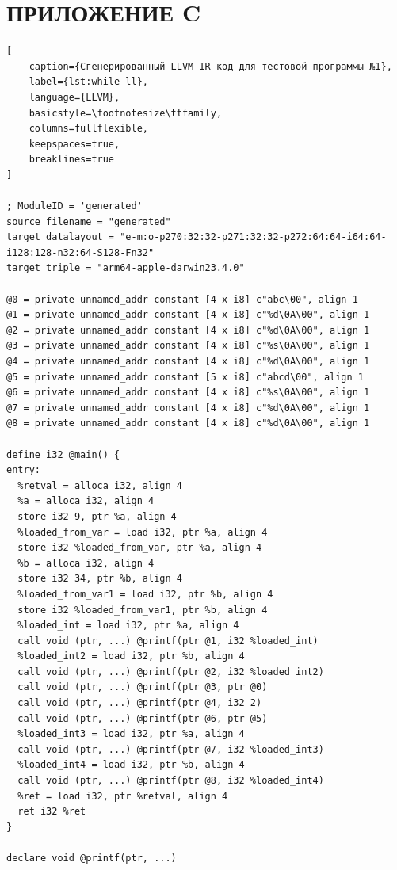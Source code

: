 \chapter*{\textbf{ПРИЛОЖЕНИЕ C}}


\begin{lstlisting}[
    caption={Сгенерированный LLVM IR код для тестовой программы №1},
    label={lst:while-ll},
    language={LLVM},
    basicstyle=\footnotesize\ttfamily,
    columns=fullflexible,
    keepspaces=true,
    breaklines=true
]

; ModuleID = 'generated'
source_filename = "generated"
target datalayout = "e-m:o-p270:32:32-p271:32:32-p272:64:64-i64:64-i128:128-n32:64-S128-Fn32"
target triple = "arm64-apple-darwin23.4.0"

@0 = private unnamed_addr constant [4 x i8] c"abc\00", align 1
@1 = private unnamed_addr constant [4 x i8] c"%d\0A\00", align 1
@2 = private unnamed_addr constant [4 x i8] c"%d\0A\00", align 1
@3 = private unnamed_addr constant [4 x i8] c"%s\0A\00", align 1
@4 = private unnamed_addr constant [4 x i8] c"%d\0A\00", align 1
@5 = private unnamed_addr constant [5 x i8] c"abcd\00", align 1
@6 = private unnamed_addr constant [4 x i8] c"%s\0A\00", align 1
@7 = private unnamed_addr constant [4 x i8] c"%d\0A\00", align 1
@8 = private unnamed_addr constant [4 x i8] c"%d\0A\00", align 1

define i32 @main() {
entry:
  %retval = alloca i32, align 4
  %a = alloca i32, align 4
  store i32 9, ptr %a, align 4
  %loaded_from_var = load i32, ptr %a, align 4
  store i32 %loaded_from_var, ptr %a, align 4
  %b = alloca i32, align 4
  store i32 34, ptr %b, align 4
  %loaded_from_var1 = load i32, ptr %b, align 4
  store i32 %loaded_from_var1, ptr %b, align 4
  %loaded_int = load i32, ptr %a, align 4
  call void (ptr, ...) @printf(ptr @1, i32 %loaded_int)
  %loaded_int2 = load i32, ptr %b, align 4
  call void (ptr, ...) @printf(ptr @2, i32 %loaded_int2)
  call void (ptr, ...) @printf(ptr @3, ptr @0)
  call void (ptr, ...) @printf(ptr @4, i32 2)
  call void (ptr, ...) @printf(ptr @6, ptr @5)
  %loaded_int3 = load i32, ptr %a, align 4
  call void (ptr, ...) @printf(ptr @7, i32 %loaded_int3)
  %loaded_int4 = load i32, ptr %b, align 4
  call void (ptr, ...) @printf(ptr @8, i32 %loaded_int4)
  %ret = load i32, ptr %retval, align 4
  ret i32 %ret
}

declare void @printf(ptr, ...)

\end{lstlisting}



